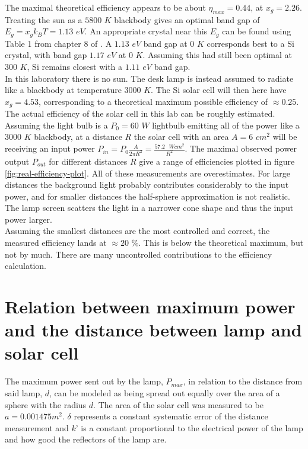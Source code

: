 \documentclass[a4paper,twoside=false,abstract=false,numbers=noenddot,
titlepage=false,headings=small,parskip=half,version=last]{scrartcl}
\begin{document}
The maximal theoretical efficiency appears to be about $\eta_{max}=0.44$, at $x_g=2.26$.
Treating the sun as a $5800$ $K$ blackbody gives an optimal band gap of $E_g = x_g k_B T = 1.13$ $eV$.
An appropriate crystal near this $E_g$ can be found using Table 1 from chapter 8 of \cite{Kittel}.
A $1.13$ $eV$ band gap at $0$ $K$ corresponds best to a Si crystal, with band gap $1.17$ $eV$ at $0$ $K$.
Assuming this had still been optimal at $300$ $K$, Si remains closest with a $1.11$ $eV$ band gap.\\
In this laboratory there is no sun. The desk lamp is instead assumed to radiate like a blackbody at temperature $3000$ $K$. The Si solar cell will then here have $x_g = 4.53$, corresponding to a theoretical maximum possible efficiency of $\approx 0.25$.\\
The actual efficiency of the solar cell in this lab can be roughly estimated.
Assuming the light bulb is a $P_0=60$ $W$ lightbulb emitting all of the power like a $3000$ $K$ blackbody, at a distance $R$ the solar cell with an area $A=6$ $cm^2$ will be receiving an input power $P_{in} = P_0 \frac{A}{2\pi R^2} = \frac{57.2\text{ }Wcm^2}{R^2}$.
The maximal observed power output $P_{out}$ for different distances $R$ give a range of efficiencies plotted in figure \ref{fig:real-efficiency-plot}.
All of these measurements are overestimates.
For large distances the background light probably contributes considerably to the input power, and for smaller distances the half-sphere approximation is not realistic.
The lamp screen scatters the light in a narrower cone shape and thus the input power larger.\\
Assuming the smallest distances are the most controlled and correct, the measured efficiency lands at $\approx 20$ $\%$. This is below the theoretical maximum, but not by much. There are many uncontrolled contributions to the efficiency calculation.

\section{Relation between maximum power and the distance between lamp and solar cell}
The maximum power sent out by the lamp, $P_{max}$, in relation to the distance from said lamp, $d$, can be modeled as being spread out equally over the area of a sphere with the radius $d$. The area of the solar cell was measured to be $a=0.001475 m^{2}$. $\delta$ represents a constant systematic error of the distance measurement and $k’$ is a constant proportional to the electrical power of the lamp and how good the reflectors of the lamp are.
\end{document}
